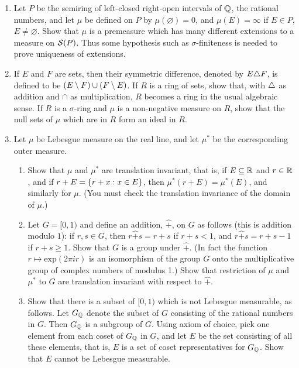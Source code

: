 \begin{enumerate}[label=\arabic*),ref=\arabic*]
\item\label{exer:non unique extension measure} Let $P$ be the semiring of left-closed right-open intervals of $\mathbb{Q}$, the rational numbers, and let $\mu$ be defined on $P$ by $\mu(\varnothing)=0$, and $\mu(E)=\infty$ if $E\in P$, $E\neq\varnothing$. Show that $\mu$ is a premeasure which has many different extensions to a measure on ${\cal S}(P)$. Thus some hypothesis such as $\sigma$-finiteness is needed to prove uniqueness of extensions.

\item\label{exer:null set as ideal}
If $E$ and $F$ are sets, then their symmetric difference, denoted by $E\triangle F$, is defined to be $(E\setminus F)\cup(F\setminus E)$. If $R$ is a ring of sets, show that, with $\triangle$ as addition and $\cap$ as multiplication, $R$ becomes a ring in the usual algebraic sense. If $R$ is a $\sigma$-ring and $\mu$ is a non-negative measure on $R$, show that the null sets of $\mu$ which are in $R$ form an ideal in $R$.

\item\label{exer:lebesgue measure rotation inv}
Let $\mu$ be Lebesgue measure on the real line, and let $\mu^*$ be the corresponding outer measure.
\begin{enumerate}[label=\alph*),ref=\theenumi\alph*)]
    \item\label{exer:item:translation inv}
    Show that $\mu$ and $\mu^*$ are translation invariant, that is, if $E\subseteq\mathbb{R}$ and $r\in\mathbb{R}$, and if $r+E=\left\{r+x:x\in E\right\}$, then $\mu^*(r+E)=\mu^*(E)$, and similarly for $\mu$. (You must check the translation invariance of the domain of $\mu$.)
    
    \item Let $G=[0,1)$ and define an addition, $\widehat{+}$, on $G$ as follows (this is addition modulo $1$): if $r,s\in G$, then $r\widehat{+}s=r+s$ if $r+s<1$, and $r\widehat{+}s=r+s-1$ if $r+s\geq1$. Show that $G$ is a group under $\widehat{+}$. (In fact the function $r\mapsto\text{exp}(2\pi ir)$ is an isomorphism of the group $G$ onto the multiplicative group of complex numbers of modulus 1.) Show that restriction of $\mu$ and $\mu^*$ to $G$ are translation invariant with respect to $\widehat{+}$.
    
    \item Show that there is a subset of $[0,1)$ which is not Lebesgue measurable, as follows. Let $G_{\mathbb{Q}}$ denote the subset of $G$ consisting of the rational numbers in $G$. Then $G_{\mathbb{Q}}$ is a subgroup of $G$. Using axiom of choice, pick one element from each coset of $G_{\mathbb{Q}}$ in $G$, and let $E$ be the set consisting of all these elements, that is, $E$ is a set of coset representatives for $G_{\mathbb{Q}}$. Show that $E$ cannot be Lebesgue measurable.
\end{enumerate}

\end{enumerate}